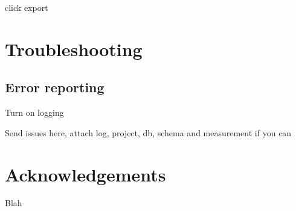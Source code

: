 \documentclass[10pt,a4paper,oneside]{report}             %
\begin{document}
click export

\chapter{Troubleshooting}


\section{Error reporting}

Turn on logging

Send issues here, attach log, project, db, schema and measurement if you can



\nocite{*}
\printbibliography[title=Further Information,heading=subbibliography,keyword=0]


\chapter*{Acknowledgements}

Blah

\label{page:last}
\end{document}
